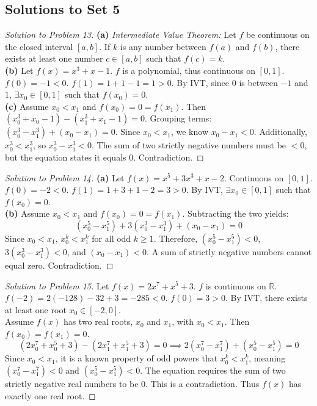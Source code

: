 \documentclass{article}
\begin{document}
\subsection{Solutions to Set 5}
\begin{proof}[Solution to Problem 13]
\textbf{(a)} \textit{Intermediate Value Theorem:} Let $f$ be continuous on the closed interval $[a,b]$. If $k$ is any number between $f(a)$ and $f(b)$, there exists at least one number $c \in [a,b]$ such that $f(c) = k$. \\
\textbf{(b)} Let $f(x) = x^3+x-1$. $f$ is a polynomial, thus continuous on $[0,1]$. $f(0) = -1 < 0$. $f(1) = 1+1-1 = 1 > 0$. By IVT, since $0$ is between $-1$ and $1$, $\exists x_0 \in [0,1]$ such that $f(x_0)=0$. \\
\textbf{(c)} Assume $x_0 < x_1$ and $f(x_0) = 0 = f(x_1)$. Then $(x_0^3+x_0-1) - (x_1^3+x_1-1) = 0$. Grouping terms: $(x_0^3 - x_1^3) + (x_0 - x_1) = 0$. Since $x_0 < x_1$, we know $x_0 - x_1 < 0$. Additionally, $x_0^3 < x_1^3$, so $x_0^3 - x_1^3 < 0$. The sum of two strictly negative numbers must be $<0$, but the equation states it equals $0$. Contradiction.
\end{proof}

\begin{proof}[Solution to Problem 14]
\textbf{(a)} Let $f(x) = x^5+3x^3+x-2$. Continuous on $[0,1]$. $f(0) = -2 < 0$. $f(1) = 1+3+1-2 = 3 > 0$. By IVT, $\exists x_0 \in [0,1]$ such that $f(x_0)=0$. \\
\textbf{(b)} Assume $x_0 < x_1$ and $f(x_0) = 0 = f(x_1)$. Subtracting the two yields:
\[ (x_0^5 - x_1^5) + 3(x_0^3 - x_1^3) + (x_0 - x_1) = 0 \]
Since $x_0 < x_1$, $x_0^k < x_1^k$ for all odd $k \ge 1$. Therefore, $(x_0^5 - x_1^5) < 0$, $3(x_0^3 - x_1^3) < 0$, and $(x_0 - x_1) < 0$. A sum of strictly negative numbers cannot equal zero. Contradiction.
\end{proof}

\begin{proof}[Solution to Problem 15]
Let $f(x) = 2x^7+x^5+3$. $f$ is continuous on $\mathbb{R}$. $f(-2) = 2(-128) - 32 + 3 = -285 < 0$. $f(0) = 3 > 0$. By IVT, there exists at least one root $x_0 \in [-2,0]$. \\
Assume $f(x)$ has two real roots, $x_0$ and $x_1$, with $x_0 < x_1$. Then $f(x_0) = f(x_1) = 0$.
\[ (2x_0^7 + x_0^5 + 3) - (2x_1^7 + x_1^5 + 3) = 0 \implies 2(x_0^7 - x_1^7) + (x_0^5 - x_1^5) = 0 \]
Since $x_0 < x_1$, it is a known property of odd powers that $x_0^k < x_1^k$, meaning $(x_0^7 - x_1^7) < 0$ and $(x_0^5 - x_1^5) < 0$. 
The equation requires the sum of two strictly negative real numbers to be $0$. This is a contradiction. Thus $f(x)$ has exactly one real root.
\end{proof}
\end{document}
